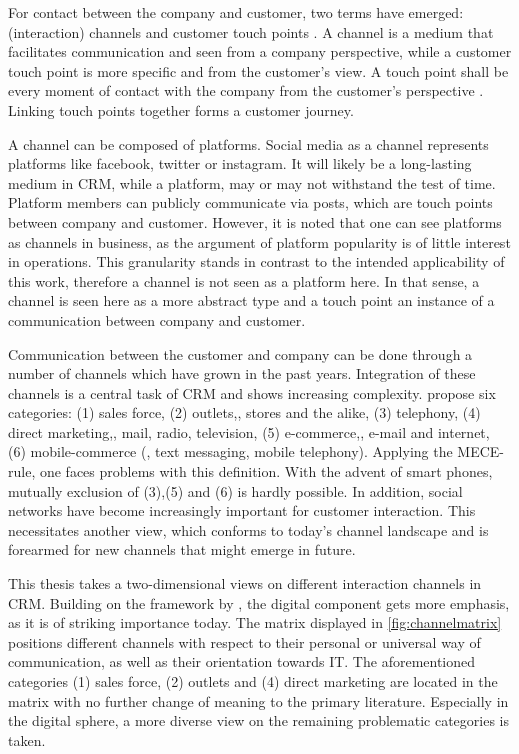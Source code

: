 		 For contact between the company and customer, two terms have emerged: (interaction) channels and customer touch points \citep{Leuer2011}. A channel is a medium that facilitates communication and seen from a company perspective, while a customer touch point is more specific and from the customer's view. A touch point shall be every moment of contact with the company from the customer's perspective \citep{Zomerdijk_2010}. Linking touch points together forms a customer journey. 
		 
		 A channel can be composed of platforms. Social media as a channel represents platforms like facebook, twitter or instagram. It will likely be a long-lasting medium in CRM, while a platform, may or may not withstand the test of time. Platform members can publicly communicate via posts, which are touch points between company and customer. 
		 However, it is noted that one can see platforms as channels in business, as the argument of platform popularity is of little interest in operations. This granularity stands in contrast to the intended applicability of this work, therefore a channel is  not seen as a platform here. 
		 In that sense, a channel is seen here as a more abstract type and a touch point an instance of a communication between company and customer. 
		
		Communication between the customer and company can be done through a number of channels which have grown in the past years. Integration of these channels is a central task of CRM and shows increasing complexity. \cite{paynefrow2005} propose six categories: (1) sales force, (2) outlets,\ie, stores and the alike, (3) telephony, (4) direct marketing,\ie, mail, radio, television, (5) e-commerce,\ie, e-mail and internet, (6) mobile-commerce (\ie, text messaging, mobile telephony). Applying the \acrfull{MECE}-rule, one faces problems with this definition. With the advent of smart phones, mutually exclusion of (3),(5) and (6) is hardly possible. In addition, social networks have become increasingly important for customer interaction. This necessitates another view, which conforms to today's channel landscape and is forearmed for new channels that might emerge in future. 
		
		This thesis takes a two-dimensional views on different interaction channels in CRM. Building on the framework by \citeauthor{paynefrow2005}, the digital component gets more emphasis, as it is of striking importance today. The matrix displayed in \ref{fig:channelmatrix} positions different channels with respect to their personal or universal way of communication, as well as their orientation towards IT. The aforementioned categories (1) sales force, (2) outlets and (4) direct marketing are located in the matrix with no further change of meaning to the primary literature. Especially in the digital sphere, a more diverse view on the remaining problematic categories is taken.
		
